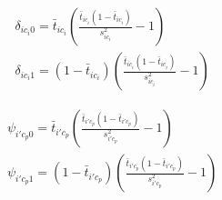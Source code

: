 \documentclass{article}
\begin{document}
\begin{align*}
	&\delta_{ic_i0}=\bar{t}_{ic_i}(\frac{\bar{t}_{ic_i}(1-\bar{t}_{ic_i})}{s_{ic_i}^2}-1)\\
	&\delta_{ic_i1}=(1-\bar{t}_{ic_i})(\frac{\bar{t}_{ic_i}(1-\bar{t}_{ic_i})}{s_{ic_i}^2}-1)
\end{align*}

\begin{align*}
	&\psi_{i'c_p0}=\bar{t}_{i'c_p}(\frac{\bar{t}_{i'c_p}(1-\bar{t}_{i'c_p})}{s_{i'c_p}^2}-1)\\
	&\psi_{i'c_p1}=(1-\bar{t}_{i'c_p})(\frac{\bar{t}_{i'c_p}(1-\bar{t}_{i'c_p})}{s_{i'c_p}^2}-1)
\end{align*}
\end{document}
